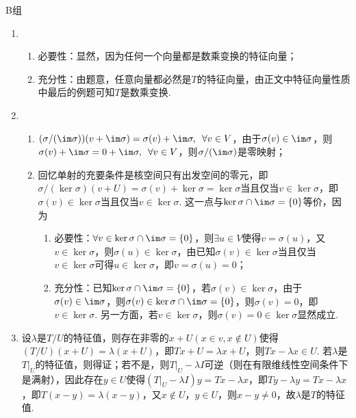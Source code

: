 \centerline{\heiti B组}
\begin{enumerate}
    \item \begin{enumerate}
              \item 必要性：显然，因为任何一个向量都是数乘变换的特征向量；

              \item 充分性：由题意，任意向量都必然是$T$的特征向量，由正文中特征向量性质中最后的例题可知$T$是数乘变换.
          \end{enumerate}

    \item \begin{enumerate}
              \item $(\sigma/(\im\sigma))(v+\im\sigma)=\sigma(v)+\im\sigma,\enspace\forall v\in V$，由于$\sigma(v)\in\im\sigma$，则$\sigma(v)+\im\sigma=0+\im\sigma,\enspace\forall v\in V$，则$\sigma/(\im\sigma)$是零映射；

              \item 回忆单射的充要条件是核空间只有出发空间的零元，即$\sigma/(\ker \sigma)(v+U)=\sigma(v)+\ker\sigma=\ker\sigma$当且仅当$v\in\ker\sigma$，即$\sigma(v)\in\ker\sigma$当且仅当$v\in\ker\sigma$. 这一点与$\ker \sigma\cap\im \sigma=\{0\}$等价，因为
                    \begin{enumerate}
                        \item 必要性：$\forall v\in\ker \sigma\cap\im \sigma=\{0\}$，则$\exists u\in V$使得$v=\sigma(u)$，又$v\in\ker\sigma$，则$\sigma(u)\in\ker\sigma$，由已知$\sigma(v)\in\ker\sigma$当且仅当$v\in\ker\sigma$可得$u\in\ker\sigma$，即$v=\sigma(u)=0$；

                        \item 充分性：已知$\ker \sigma\cap\im \sigma=\{0\}$，若$\sigma(v)\in\ker\sigma$，由于$\sigma(v)\in\im\sigma$，则$\sigma(v)\in\ker\sigma\cap\im\sigma=\{0\}$，则$\sigma(v)=0$，即$v\in\ker\sigma$. 另一方面，若$v\in\ker\sigma$，则$\sigma(v)=0\in\ker\sigma$显然成立.
                    \end{enumerate}
          \end{enumerate}

    \item 设$\lambda$是$T/U$的特征值，则存在非零的$x+U(x\in v,x\notin U)$使得$(T/U)(x+U)=\lambda(x+U)$，即$Tx+U=\lambda x+U$，则$Tx-\lambda x\in U$. 若$\lambda$是$T\vert_U$的特征值，则得证；若不是，则$T\vert_U-\lambda I$可逆（则在有限维线性空间条件下是满射），因此存在$y\in U$使得$(T\vert_U-\lambda I)y=Tx-\lambda x$，即$Ty-\lambda y=Tx-\lambda x$，即$T(x-y)=\lambda(x-y)$，又$x\notin U$，$y\in U$，则$x-y\neq 0$，故$\lambda$是$T$的特征值.


\end{enumerate}
